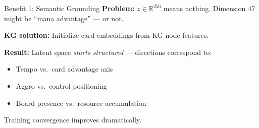 \documentclass[aspectratio=169, 11pt]{beamer}
\begin{document}
\begin{frame}{Benefit 1: Semantic Grounding}
  \textbf{Problem:} $z \in \mathbb{R}^{256}$ means nothing. Dimension 47 might be ``mana advantage'' --- or not.

  \vspace{0.3cm}
  \textbf{KG solution:} Initialize card embeddings from KG node features.
  \vspace{0.2cm}


  \vspace{0.4cm}
  \textbf{Result:} Latent space \textit{starts structured} --- directions correspond to:
  \begin{itemize}
    \item Tempo vs.\ card advantage axis
    \item Aggro vs.\ control positioning
    \item Board presence vs.\ resource accumulation
  \end{itemize}
  \vspace{0.2cm}
  Training convergence improves dramatically.
\end{frame}
\end{document}
